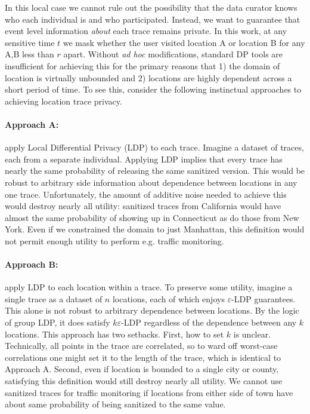 In this local case we cannot rule out the possibility that the data curator knows who each individual is and who participated. Instead, we want to guarantee that event level information \emph{about} each trace remains private. In this work, at any sensitive time $t$ we mask whether the user visited location A or location B for any A,B less than $r$ apart. Without \emph{ad hoc} modifications, standard DP tools are insufficient for achieving this for the primary reasons that 1) the domain of location is virtually unbounded and 2) locations are highly dependent across a short period of time. To see this, consider the following instinctual approaches to achieving location trace privacy. 

\paragraph{Approach A:} apply Local Differential Privacy (LDP) to each trace. Imagine a dataset of traces, each from a separate individual. Applying LDP implies that every trace has nearly the same probability of releasing the same sanitized version. This would be robust to arbitrary side information about dependence between locations in any one trace. Unfortunately, the amount of additive noise needed to achieve this would destroy nearly all utility: sanitized traces from California would have almost the same probability of showing up in Connecticut as do those from New York. Even if we constrained the domain to just Manhattan, this definition would not permit enough utility to perform e.g. traffic monitoring. 

\paragraph{Approach B:} apply LDP to each location within a trace. To preserve some utility, imagine a single trace as a dataset of $n$ locations, each of which enjoys $\varepsilon$-LDP guarantees. This alone is not robust to arbitrary dependence between locations. By the logic of group LDP, it does satisfy $k \varepsilon$-LDP regardless of the dependence between any $k$ locations. This approach has two setbacks. First, how to set $k$ is unclear. Technically, all points in the trace are correlated, so to ward off worst-case correlations one might set it to the length of the trace, which is identical to Approach A. Second, even if location is bounded to a single city or county, satisfying this definition would still destroy nearly all utility. We cannot use sanitized traces for traffic monitoring if locations from either side of town have about same probability of being sanitized to the same value. 

